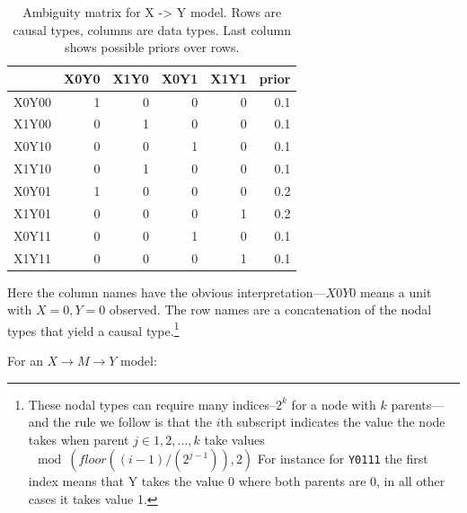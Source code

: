 \documentclass[12pt,]{book}
\let\rmarkdownfootnote\footnote%
\def\footnote{\protect\rmarkdownfootnote}
\begin{document}
\begin{table}[t]

\caption{\label{tab:unnamed-chunk-27}Ambiguity matrix for X -> Y model. Rows are causal types, columns are data types. Last column shows possible priors over rows.}
\centering
\begin{tabular}{l|r|r|r|r|r}
\hline
  & X0Y0 & X1Y0 & X0Y1 & X1Y1 & prior\\
\hline
X0Y00 & 1 & 0 & 0 & 0 & 0.1\\
\hline
X1Y00 & 0 & 1 & 0 & 0 & 0.1\\
\hline
X0Y10 & 0 & 0 & 1 & 0 & 0.1\\
\hline
X1Y10 & 0 & 1 & 0 & 0 & 0.1\\
\hline
X0Y01 & 1 & 0 & 0 & 0 & 0.2\\
\hline
X1Y01 & 0 & 0 & 0 & 1 & 0.2\\
\hline
X0Y11 & 0 & 0 & 1 & 0 & 0.1\\
\hline
X1Y11 & 0 & 0 & 0 & 1 & 0.1\\
\hline
\end{tabular}
\end{table}

Here the column names have the obvious interpretation---\(X0Y0\) means a unit with \(X=0, Y=0\) observed. The row names are a concatenation of the nodal types that yield a causal type.\footnote{These nodal types can require many indices--\(2^k\) for a node with \(k\) parents---and the rule we follow is that the \(i\)th subscript indicates the value the node takes when parent \(j \in {1, 2, ..., k}\) take values \(\mod(floor((i-1)/(2^{j-1})), 2)\) For instance for \texttt{Y0111} the first index means that Y takes the value 0 where both parents are 0, in all other cases it takes value 1.}

For an \(X \rightarrow M \rightarrow Y\) model:
\end{document}

